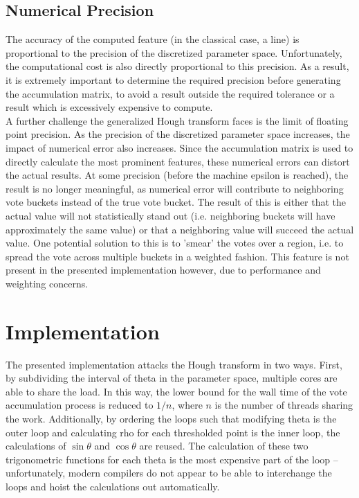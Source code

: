 \documentclass[letterpaper,12pt,titlepage]{article}
\begin{document}
\subsection{Numerical Precision}
The accuracy of the computed feature (in the classical case, a line) is proportional to the
precision of the discretized parameter space. Unfortunately, the computational cost is also
directly proportional to this precision. As a result, it is extremely important to determine
the required precision before generating the accumulation matrix, to avoid a result outside
the required tolerance or a result which is excessively expensive to compute.
\\
A further challenge the generalized Hough transform faces is the limit of floating point
precision. As the precision of the discretized parameter space increases, the impact of
numerical error also increases. Since the accumulation matrix is used to directly calculate
the most prominent features, these numerical errors can distort the actual results. At some
precision (before the machine epsilon is reached), the result is no longer meaningful, as
numerical error will contribute to neighboring vote buckets instead of the true vote bucket.
The result of this is either that the actual value will not statistically stand out
(i.e. neighboring buckets will have approximately the same value) or that a neighboring value
will succeed the actual value. One potential solution to this is to 'smear' the votes over a
region, i.e. to spread the vote across multiple buckets in a weighted fashion. This feature
is not present in the presented implementation however, due to performance and weighting concerns.

\section{Implementation}
The presented implementation attacks the Hough transform in two ways. First, by subdividing the
interval of theta in the parameter space, multiple cores are able to share the load. In this way,
the lower bound for the wall time of the vote accumulation process is reduced to $1/n$, where $n$
is the number of threads sharing the work. Additionally, by ordering the loops such that modifying
theta is the outer loop and calculating rho for each thresholded point is the inner loop, the
calculations of $\sin{\theta}$ and $\cos{\theta}$ are reused. The calculation of these two
trigonometric functions for each theta is the most expensive part of the loop -- unfortunately,
modern compilers do not appear to be able to interchange the loops and hoist the calculations
out automatically.
\end{document}
